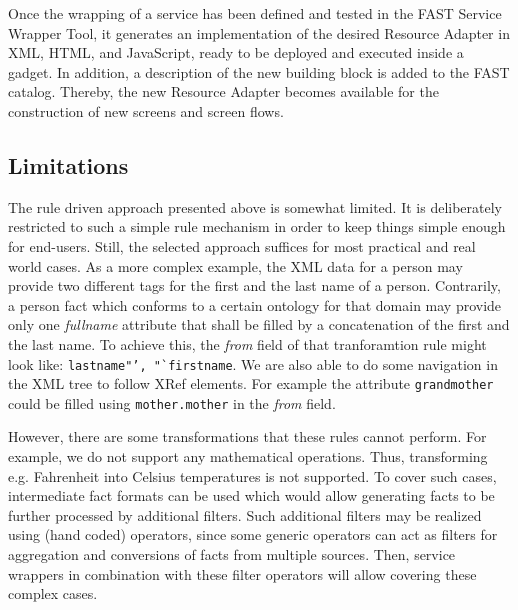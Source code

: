 \documentclass{article}
\begin{document}
Once the wrapping of a service has been defined and tested in the FAST Service Wrapper Tool, it generates an implementation of the desired Resource Adapter in XML, HTML, and JavaScript, ready to be deployed and executed inside a gadget. In addition, a description of the new building block is added to the FAST catalog. Thereby, the new Resource Adapter becomes available for the construction of new screens and screen flows. 


\subsection{Limitations} %
\label{sub:limitations}

The rule driven approach presented above is somewhat limited. It is deliberately restricted to such a simple rule mechanism in order to keep things simple enough for end-users. Still, the selected approach suffices for most practical and real world cases. As a more complex example, the XML data for a person may provide two different tags for the first and the last name of a person. Contrarily, a person fact which conforms to a certain ontology for that domain may provide only one \emph{fullname} attribute that shall be filled by a concatenation of the first and the last name. To achieve this, the \textit{from} field of that tranforamtion rule might look like: \texttt{lastname"', "`firstname}. We are also able to do some navigation in the XML tree to follow XRef elements. For example the attribute \texttt{grandmother} could be filled using \texttt{mother.mother} in the \textit{from} field. 

However, there are some transformations that these rules cannot perform. For example, we do not support any mathematical operations. Thus, transforming e.g. Fahrenheit into Celsius temperatures is not supported. To cover such  cases, intermediate fact formats can be used which would allow generating facts to be further processed by additional filters. Such additional filters may be realized using (hand coded) operators, since some generic operators can act as filters for aggregation and conversions of facts from multiple sources. Then, service wrappers in combination with these filter operators will allow covering these complex cases.


\end{document}
